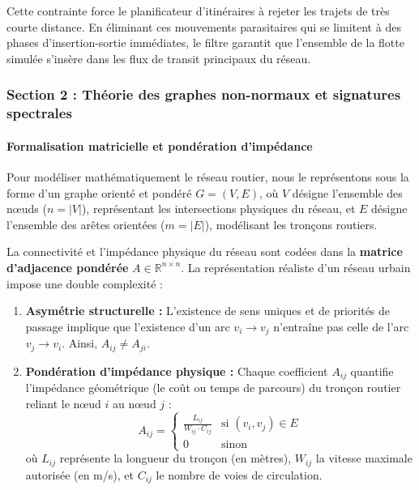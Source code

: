 \documentclass[10pt, a4paper]{article}
\providecommand{\tightlist}{}
\begin{document}
Cette contrainte force le planificateur d'itinéraires à rejeter les
trajets de très courte distance. En éliminant ces mouvements
parasitaires qui se limitent à des phases d'insertion-sortie immédiates,
le filtre garantit que l'ensemble de la flotte simulée s'insère dans les
flux de transit principaux du réseau.

\subsubsection{Section 2 : Théorie des graphes non-normaux et signatures
spectrales}\label{section-2-thuxe9orie-des-graphes-non-normaux-et-signatures-spectrales}

\paragraph{Formalisation matricielle et pondération
d'impédance}\label{formalisation-matricielle-et-ponduxe9ration-dimpuxe9dance}

Pour modéliser mathématiquement le réseau routier, nous le représentons
sous la forme d'un graphe orienté et pondéré \(G = (V, E)\), où \(V\)
désigne l'ensemble des nœuds (\(n = |V|\)), représentant les
intersections physiques du réseau, et \(E\) désigne l'ensemble des
arêtes orientées (\(m = |E|\)), modélisant les tronçons routiers.

La connectivité et l'impédance physique du réseau sont codées dans la
\textbf{matrice d'adjacence pondérée} \(A \in \mathbb{R}^{n \times n}\).
La représentation réaliste d'un réseau urbain impose une double
complexité :

\begin{enumerate}
\def\labelenumi{\arabic{enumi}.}
\tightlist
\item
  \textbf{Asymétrie structurelle :} L'existence de sens uniques et de
  priorités de passage implique que l'existence d'un arc \(v_i \to v_j\)
  n'entraîne pas celle de l'arc \(v_j \to v_i\). Ainsi,
  \(A_{ij} \neq A_{ji}\).
\item
  \textbf{Pondération d'impédance physique :} Chaque coefficient
  \(A_{ij}\) quantifie l'impédance géométrique (le coût ou temps de
  parcours) du tronçon routier reliant le nœud \(i\) au nœud \(j\) :
  \[A_{ij} = \begin{cases} \frac{L_{ij}}{W_{ij} \cdot C_{ij}} & \text{si } (v_i, v_j) \in E \\ 0 & \text{sinon} \end{cases}\]
  où \(L_{ij}\) représente la longueur du tronçon (en mètres),
  \(W_{ij}\) la vitesse maximale autorisée (en m/s), et \(C_{ij}\) le
  nombre de voies de circulation.
\end{enumerate}
\end{document}
